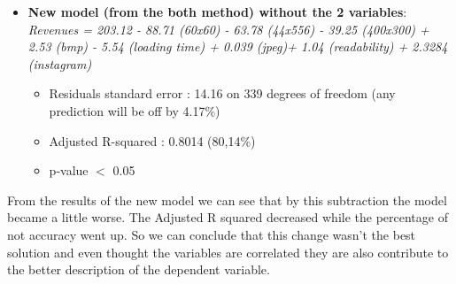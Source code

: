 \documentclass{article}
\begin{document}
\begin{itemize}
\item \textbf{New model (from the both method) without the 2 variables}:\\
\textit{Revenues = 203.12 - 88.71 (60x60) - 63.78 (44x556) - 39.25 (400x300) + 2.53 (bmp) - 5.54 (loading time) + 0.039 (jpeg)+ 1.04 (readability) + 2.3284 (instagram) }
\begin{itemize}
\item Residuals standard error : 14.16 on 339 degrees of freedom (any prediction will be off by 4.17\%)
\item Adjusted R-squared : 0.8014 (80,14\%)
\item p-value $<$ 0.05
\end{itemize}
\end{itemize}
From the results of the new model we can see that by this subtraction the model became a little worse. The Adjusted R squared decreased while the percentage of not accuracy went up. So we can conclude that this change wasn't the best solution and even thought the variables are correlated they are also contribute to the better description of the dependent variable. 
\end{document}
